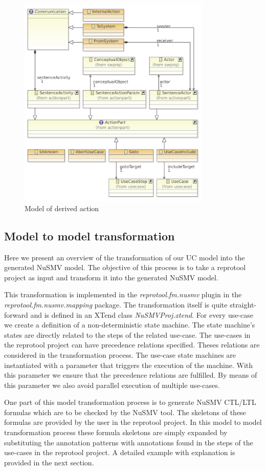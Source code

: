 \begin{figure}[ht]
  \centering
  \includegraphics[width=260pt]{images/ReprotoolActionsModel}
  \caption{Model of derived action}
  \label{fig:ReprotoolActionsModel}
\end{figure}

\subsection{Model to model transformation}

Here we present an overview of the transformation of our UC model into the generated NuSMV model. The objective of this process is to
take a reprotool project as input and transform it into the generated NuSMV model.

This transformation is implemented in the \emph{reprotool.fm.nusmv} plugin in the \emph{reprotool.fm.nusmv.mapping} package.
The transformation itself is quite straight-forward and is defined in an XTend class \emph{NuSMVProj.xtend}.
For every use-case we create a definition of a non-deterministic state machine.
The state machine's states are directly related to the steps of the related use-case.
The use-cases in the reprotool project can have precedence relations specified. Theses relations are considered in the
transformation process. The use-case state machines are instantiated with a parameter that triggers the execution of the machine.
With this parameter we ensure that the precedence relations are fulfilled. By means of this parameter we also avoid parallel execution
of multiple use-cases.

One part of this model transformation process is to generate NuSMV CTL/LTL formulas which are to be checked by the NuSMV tool. The
skeletons of these formulas are provided by the user in the reprotool project. In this model to model transformation process these
formula skeletons are simply expanded by substituting the annotation patterns with annotations found in the steps of the use-cases
in the reprotool project. A detailed example with explanation is provided in the next section.

